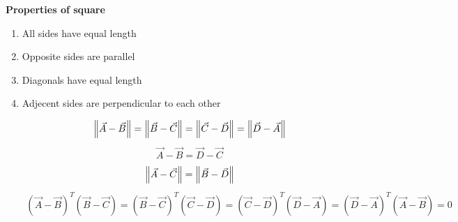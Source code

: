 \documentclass[12pt]{article}
\begin{document}
\newpage
\textbf{\Large Properties of square}\\
\begin{enumerate}
    \item All sides have equal length
    \item Opposite sides are parallel
    \item Diagonals have equal length
    \item Adjecent sides are perpendicular to each other


    \begin{align}
        \left\lVert\Vec{A}-\Vec{B}\right\rVert= \left\lVert\Vec{B}-\Vec{C}\right\rVert= \left\lVert\Vec{C}-\Vec{D}\right\rVert= \left\lVert\Vec{D}-\Vec{A}\right\rVert
    \end{align}
    \begin{align}
        \Vec{A}-\Vec{B}=\Vec{D}-\Vec{C}
    \end{align}
    \begin{align}
         \left\lVert\Vec{A}-\Vec{C}\right\rVert= \left\lVert\Vec{B}-\Vec{D}\right\rVert
    \end{align}
    \begin{align}
        (\Vec{A}-\Vec{B})^T(\Vec{B}-\Vec{C})=(\Vec{B}-\Vec{C})^T(\Vec{C}-\Vec{D})=(\Vec{C}-\Vec{D})^T(\Vec{D}-\Vec{A})=(\Vec{D}-\Vec{A})^T(\Vec{A}-\Vec{B})=0
\end{align}
\end{enumerate}
\end{document}
